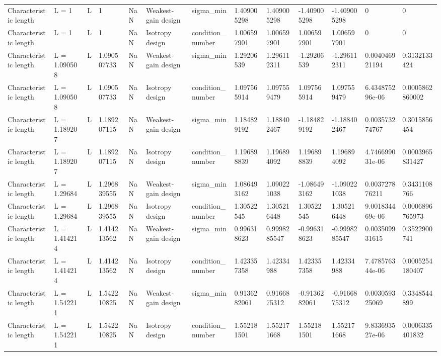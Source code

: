 \begin{tabular}{@{}lllllllllllll@{}}
Characteristic length & L = 1 & L & 1 & NaN & Weakest-gain design & sigma\_min & 1.409005298 & 1.409005298 & -1.409005298 & -1.409005298 & 0 & 0 \\
Characteristic length & L = 1 & L & 1 & NaN & Isotropy design & condition\_number & 1.006597901 & 1.006597901 & 1.006597901 & 1.006597901 & 0 & 0 \\
Characteristic length & L = 1.090508 & L & 1.090507733 & NaN & Weakest-gain design & sigma\_min & 1.29206539 & 1.296112311 & -1.29206539 & -1.296112311 & 0.004046921194 & 0.3132133424 \\
Characteristic length & L = 1.090508 & L & 1.090507733 & NaN & Isotropy design & condition\_number & 1.097565914 & 1.097559479 & 1.097565914 & 1.097559479 & 6.434875296e-06 & 0.0005862860002 \\
Characteristic length & L = 1.189207 & L & 1.189207115 & NaN & Weakest-gain design & sigma\_min & 1.184829192 & 1.188402467 & -1.184829192 & -1.188402467 & 0.003573274767 & 0.3015856454 \\
Characteristic length & L = 1.189207 & L & 1.189207115 & NaN & Isotropy design & condition\_number & 1.196898839 & 1.196894092 & 1.196898839 & 1.196894092 & 4.746699031e-06 & 0.0003965831427 \\
Characteristic length & L = 1.29684 & L & 1.296839555 & NaN & Weakest-gain design & sigma\_min & 1.086493162 & 1.090221038 & -1.086493162 & -1.090221038 & 0.003727876211 & 0.3431108766 \\
Characteristic length & L = 1.29684 & L & 1.296839555 & NaN & Isotropy design & condition\_number & 1.30522545 & 1.305216448 & 1.30522545 & 1.305216448 & 9.001834469e-06 & 0.0006896765973 \\
Characteristic length & L = 1.414214 & L & 1.414213562 & NaN & Weakest-gain design & sigma\_min & 0.996318623 & 0.9998285547 & -0.996318623 & -0.9998285547 & 0.003509931615 & 0.3522900741 \\
Characteristic length & L = 1.414214 & L & 1.414213562 & NaN & Isotropy design & condition\_number & 1.423357358 & 1.42334988 & 1.423357358 & 1.42334988 & 7.478576344e-06 & 0.0005254180407 \\
Characteristic length & L = 1.542211 & L & 1.542210825 & NaN & Weakest-gain design & sigma\_min & 0.9136282061 & 0.9166875312 & -0.9136282061 & -0.9166875312 & 0.003059325069 & 0.3348544899 \\
Characteristic length & L = 1.542211 & L & 1.542210825 & NaN & Isotropy design & condition\_number & 1.552181501 & 1.552171668 & 1.552181501 & 1.552171668 & 9.833693527e-06 & 0.0006335401832 \\

\end{tabular}
